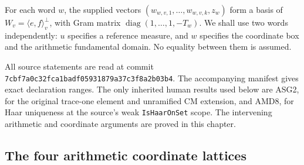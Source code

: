 \documentclass[11pt,a4paper]{article}
\numberwithin{equation}{section}
\theoremstyle{remark}\newtheorem{remark}[theorem]{Remark}
\begin{document}
For each word \(w\), the supplied vectors
\((w_{w,v,1},\ldots,w_{w,v,k},z_w)\) form a basis of
\(W_v=\langle e,f\rangle^\perp_v\), with Gram matrix
\(\operatorname{diag}(1,\ldots,1,-T_w)\).  We shall use two words
independently: \(u\) specifies a reference measure, and \(w\) specifies
the coordinate box and the arithmetic fundamental domain.  No equality
between them is assumed.

All source statements are read at commit
\texttt{7cbf7a0c32fca1badf05931879a37c3f8a2b03b4}.  The accompanying
manifest gives exact declaration ranges.  The only inherited human
results used below are ASG2, for the original trace-one element and
unramified CM extension, and AMD8, for Haar uniqueness at the source's
weak \texttt{Is\allowbreak Haar\allowbreak On\allowbreak Set} scope.  The intervening arithmetic and
coordinate arguments are proved in this chapter.

\subsection{The four arithmetic coordinate lattices}

\end{document}

